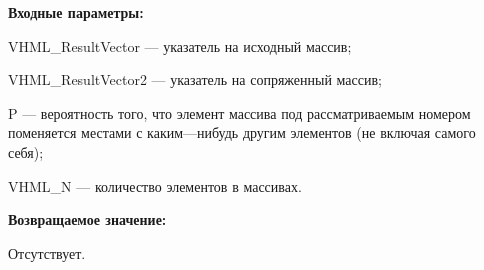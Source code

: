 \textbf{Входные параметры:}
 
VHML\_ResultVector --- указатель на исходный массив;
 
VHML\_ResultVector2 --- указатель на сопряженный массив;
 
P --- вероятность того, что элемент массива под рассматриваемым номером поменяется местами с каким---нибудь другим элементов (не включая самого себя);
 
VHML\_N --- количество элементов в массивах.

\textbf{Возвращаемое значение:}

Отсутствует.